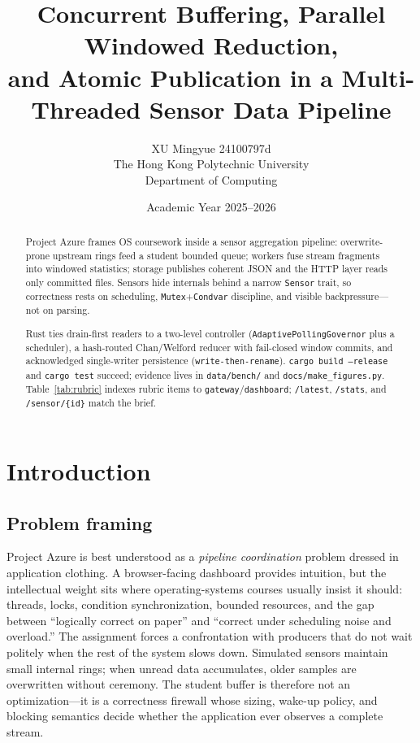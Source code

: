 \documentclass[11pt]{article}
\title{%
Concurrent Buffering, Parallel Windowed Reduction,\\
and Atomic Publication in a Multi-Threaded Sensor Data Pipeline%
}
\author{%
{\small
XU Mingyue \quad 24100797d\\[0.35em]
The Hong Kong Polytechnic University\\
Department of Computing
}%
}
\date{\small Academic Year 2025--2026}
\begin{document}
\maketitle

\begin{abstract}
Project Azure frames OS coursework inside a sensor aggregation pipeline: overwrite-prone upstream rings feed a student bounded queue; workers fuse stream fragments into windowed statistics; storage publishes coherent JSON and the HTTP layer reads only committed files. Sensors hide internals behind a narrow \texttt{Sensor} trait, so correctness rests on scheduling, \texttt{Mutex}+\texttt{Condvar} discipline, and visible backpressure---not on parsing.

Rust ties drain-first readers to a two-level controller (\texttt{AdaptivePollingGovernor} plus a scheduler), a hash-routed Chan/Welford reducer with fail-closed window commits, and acknowledged single-writer persistence (\texttt{write-then-rename}). \texttt{cargo build --release} and \texttt{cargo test} succeed; evidence lives in \texttt{data/bench/} and \texttt{docs/make\_figures.py}. Table~\ref{tab:rubric} indexes rubric items to \texttt{gateway}/\texttt{dashboard}; \texttt{/latest}, \texttt{/stats}, and \texttt{/sensor/\{id\}} match the brief.
\end{abstract}

\section{Introduction}
\subsection*{Problem framing}
Project Azure is best understood as a \emph{pipeline coordination} problem dressed in application clothing. A browser-facing dashboard provides intuition, but the intellectual weight sits where operating-systems courses usually insist it should: threads, locks, condition synchronization, bounded resources, and the gap between ``logically correct on paper'' and ``correct under scheduling noise and overload.'' The assignment forces a confrontation with producers that do not wait politely when the rest of the system slows down. Simulated sensors maintain small internal rings; when unread data accumulates, older samples are overwritten without ceremony. The student buffer is therefore not an optimization---it is a correctness firewall whose sizing, wake-up policy, and blocking semantics decide whether the application ever observes a complete stream.
\end{document}
